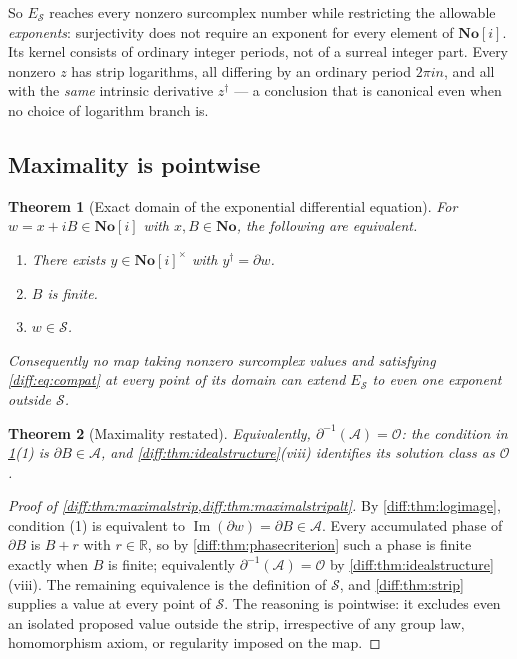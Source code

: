 \documentclass[11pt,letterpaper]{article}
\numberwithin{equation}{section}
\newtheorem{theorem}{Theorem}[section]
\theoremstyle{definition}
\theoremstyle{remark}
\newcommand{\No}{\mathbf{No}}
\newcommand{\SC}{\mathbf{No}[i]}
\newcommand{\R}{\mathbb R}
\newcommand{\der}{\partial}
\newcommand{\Ofin}{\mathcal O}
\newcommand{\Acl}{\mathcal A}
\newcommand{\Imm}{\operatorname{Im}}
\newcommand{\Strip}{\mathcal S}
\newcommand{\Estrip}{E_{\Strip}}
\begin{document}
So $\Estrip$ reaches every nonzero surcomplex number while restricting the
allowable \emph{exponents}: surjectivity does not require an exponent for
every element of $\SC$. Its kernel consists of ordinary integer periods, not
of a surreal integer part. Every nonzero $z$ has strip logarithms, all
differing by an ordinary period $2\pi in$, and all with the \emph{same}
intrinsic derivative $z^{\dagger}$ --- a conclusion that is canonical even
when no choice of logarithm branch is.

\subsection{Maximality is pointwise}
\label{diff:sub:maximality}

\begin{theorem}[Exact domain of the exponential differential equation]
\label{diff:thm:maximalstrip}
For $w=x+iB\in\SC$ with $x,B\in\No$, the following are equivalent.
\begin{enumerate}[label=\textup{(\arabic*)},leftmargin=2.4em]
\item There exists $y\in\SC^{\times}$ with $y^{\dagger}=\der w$.
\item $B$ is finite.
\item $w\in\Strip$.
\end{enumerate}
Consequently no map taking nonzero surcomplex values and satisfying
\cref{diff:eq:compat} at every point of its domain can extend $\Estrip$ to
even \emph{one} exponent outside $\Strip$.
\end{theorem}
\begin{theorem}[Maximality restated]
\label{diff:thm:maximalstripalt}
Equivalently, $\der^{-1}(\Acl)=\Ofin$: the condition in
\cref{diff:thm:maximalstrip}(1) is $\der B\in\Acl$, and
\cref{diff:thm:idealstructure}(viii) identifies its solution class as
$\Ofin$.
\end{theorem}
\begin{proof}[Proof of \cref{diff:thm:maximalstrip,diff:thm:maximalstripalt}]
By \cref{diff:thm:logimage}, condition (1) is equivalent to
$\Imm(\der w)=\der B\in\Acl$. Every accumulated phase of $\der B$ is
$B+r$ with $r\in\R$, so by \cref{diff:thm:phasecriterion} such a phase is
finite exactly when $B$ is finite; equivalently
$\der^{-1}(\Acl)=\Ofin$ by \cref{diff:thm:idealstructure}(viii). The
remaining equivalence is the definition of $\Strip$, and
\cref{diff:thm:strip} supplies a value at every point of $\Strip$. The
reasoning is pointwise: it excludes even an isolated proposed value outside
the strip, irrespective of any group law, homomorphism axiom, or regularity
imposed on the map.
\end{proof}
\end{document}

